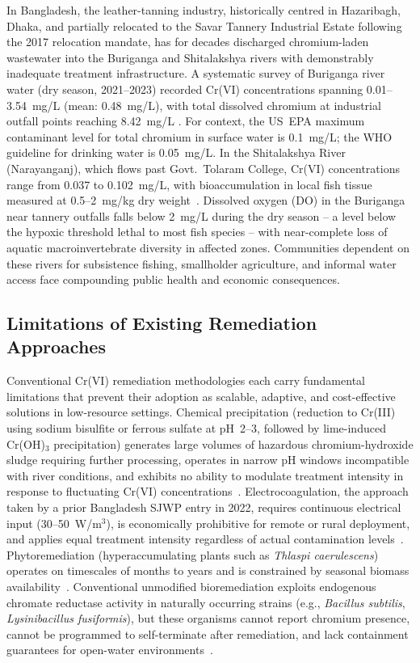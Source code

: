 \documentclass[10pt,twocolumn,letterpaper,
              colorlinks=true,
              linkcolor=blue!70!black,
              citecolor=blue!70!black,
              urlcolor=blue!70!black,
              pdfborder={0 0 0}]{article}
\begin{document}
In Bangladesh, the leather-tanning industry, historically centred in
Hazaribagh, Dhaka, and partially relocated to the Savar Tannery
Industrial Estate following the 2017 relocation mandate, has for decades
discharged chromium-laden wastewater into the Buriganga and Shitalakshya
rivers with demonstrably inadequate treatment infrastructure. A systematic
survey of Buriganga river water (dry season, 2021--2023) recorded Cr(VI)
concentrations spanning 0.01--3.54~mg/L (mean: 0.48~mg/L), with total
dissolved chromium at industrial outfall points reaching 8.42~mg/L
\cite{rahman2021,ahmed2022}. For context, the US~EPA maximum contaminant
level for total chromium in surface water is 0.1~mg/L; the WHO guideline
for drinking water is 0.05~mg/L. In the Shitalakshya River (Narayanganj),
which flows past Govt.\ Tolaram College, Cr(VI) concentrations range from
0.037 to 0.102~mg/L, with bioaccumulation in local fish tissue measured
at 0.5--2~mg/kg dry weight~\cite{islam2020,doem2022}. Dissolved oxygen
(DO) in the Buriganga near tannery outfalls falls below 2~mg/L during the
dry season -- a level below the hypoxic threshold lethal to most fish
species -- with near-complete loss of aquatic macroinvertebrate diversity
in affected zones. Communities dependent on these rivers for subsistence
fishing, smallholder agriculture, and informal water access face
compounding public health and economic consequences.

\subsection{Limitations of Existing Remediation Approaches}

Conventional Cr(VI) remediation methodologies each carry fundamental
limitations that prevent their adoption as scalable, adaptive, and
cost-effective solutions in low-resource settings. Chemical precipitation
(reduction to Cr(III) using sodium bisulfite or ferrous sulfate at
pH~2--3, followed by lime-induced Cr(OH)$_3$ precipitation) generates
large volumes of hazardous chromium-hydroxide sludge requiring further
processing, operates in narrow pH windows incompatible with river
conditions, and exhibits no ability to modulate treatment intensity in
response to fluctuating Cr(VI) concentrations~\cite{sharma2017}.
Electrocoagulation, the approach taken by a prior Bangladesh SJWP entry
in 2022, requires continuous electrical input (30--50~W/m$^3$), is
economically prohibitive for remote or rural deployment, and applies equal
treatment intensity regardless of actual contamination
levels~\cite{heidmann2008}. Phytoremediation (hyperaccumulating plants
such as \textit{Thlaspi caerulescens}) operates on timescales of months
to years and is constrained by seasonal biomass
availability~\cite{ali2013}. Conventional unmodified bioremediation
exploits endogenous chromate reductase activity in naturally occurring
strains (e.g., \textit{Bacillus subtilis}, \textit{Lysinibacillus
fusiformis}), but these organisms cannot report chromium presence, cannot
be programmed to self-terminate after remediation, and lack containment
guarantees for open-water environments~\cite{viti2003}.
\end{document}
